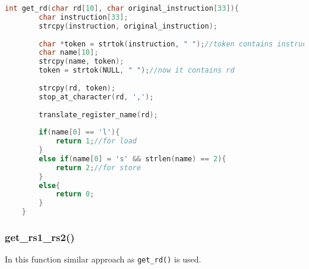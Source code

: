 \documentclass{article}
\begin{document}
\begin{lstlisting}[language=C, caption={get\_rd function}, label={code-get-rd}, backgroundcolor=\color{codebackground}]
    int get_rd(char rd[10], char original_instruction[33]){
        char instruction[33];
        strcpy(instruction, original_instruction);
    
        char *token = strtok(instruction, " ");//token contains instruction name
        char name[10];
        strcpy(name, token);
        token = strtok(NULL, " ");//now it contains rd
    
        strcpy(rd, token);
        stop_at_character(rd, ',');
    
        translate_register_name(rd);
    
        if(name[0] == 'l'){
            return 1;//for load
        }
        else if(name[0] = 's' && strlen(name) == 2){
            return 2;//for store
        }
        else{
            return 0;
        }
    }
\end{lstlisting}

\subsubsection{get\_rs1\_rs2()}
In this function similar approach as \texttt{get\_rd()} is used.
\end{document}
